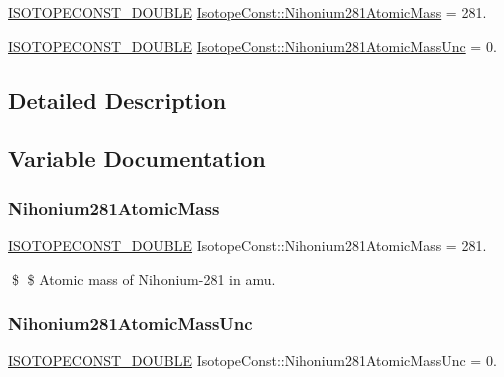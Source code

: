 \begin{DoxyCompactItemize}
\item 
\mbox{\hyperlink{group___isotope_const-_macros_ga8f45a7272ce02c0b4c65c44636ed719a}{I\+S\+O\+T\+O\+P\+E\+C\+O\+N\+S\+T\+\_\+\+D\+O\+U\+B\+LE}} \mbox{\hyperlink{group___isotope_const-_nihonium-_nh281_ga7cd2699753e5318b265d8484a95a2a27}{Isotope\+Const\+::\+Nihonium281\+Atomic\+Mass}} = 281.
\item 
\mbox{\hyperlink{group___isotope_const-_macros_ga8f45a7272ce02c0b4c65c44636ed719a}{I\+S\+O\+T\+O\+P\+E\+C\+O\+N\+S\+T\+\_\+\+D\+O\+U\+B\+LE}} \mbox{\hyperlink{group___isotope_const-_nihonium-_nh281_gade0e9b9513cbfd16ba372327c24f8756}{Isotope\+Const\+::\+Nihonium281\+Atomic\+Mass\+Unc}} = 0.
\end{DoxyCompactItemize}


\subsection{Detailed Description}


\subsection{Variable Documentation}
\mbox{\label{group___isotope_const-_nihonium-_nh281_ga7cd2699753e5318b265d8484a95a2a27}} 
\subsubsection{\texorpdfstring{Nihonium281\+Atomic\+Mass}{Nihonium281AtomicMass}}
{\footnotesize\ttfamily \mbox{\hyperlink{group___isotope_const-_macros_ga8f45a7272ce02c0b4c65c44636ed719a}{I\+S\+O\+T\+O\+P\+E\+C\+O\+N\+S\+T\+\_\+\+D\+O\+U\+B\+LE}} Isotope\+Const\+::\+Nihonium281\+Atomic\+Mass = 281.}

\$ \$ Atomic mass of Nihonium-\/281 in amu. \mbox{\label{group___isotope_const-_nihonium-_nh281_gade0e9b9513cbfd16ba372327c24f8756}} 
\subsubsection{\texorpdfstring{Nihonium281\+Atomic\+Mass\+Unc}{Nihonium281AtomicMassUnc}}
{\footnotesize\ttfamily \mbox{\hyperlink{group___isotope_const-_macros_ga8f45a7272ce02c0b4c65c44636ed719a}{I\+S\+O\+T\+O\+P\+E\+C\+O\+N\+S\+T\+\_\+\+D\+O\+U\+B\+LE}} Isotope\+Const\+::\+Nihonium281\+Atomic\+Mass\+Unc = 0.}

